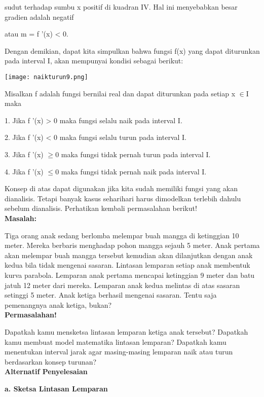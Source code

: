\documentclass[11pt,fleqn]{book} %
\begin{document}
sudut terhadap sumbu x positif di kuadran IV. Hal ini menyebabkan besar gradien adalah negatif 

atau m = f '(x) < 0.

Dengan demikian, dapat kita simpulkan bahwa fungsi f(x) yang dapat diturunkan pada interval I, akan mempunyai kondisi sebagai berikut:

\begin{center}
\texttt{[image: naikturun9.png]}
\end{center}

Misalkan f adalah fungsi bernilai real dan dapat
diturunkan pada setiap x $\in $I maka

1. Jika f '(x) > 0 maka fungsi selalu naik pada interval I.

2. Jika f '(x) < 0 maka fungsi selalu turun pada interval I.

3. Jika f '(x) $\geqslant $0 maka fungsi tidak pernah turun pada interval I.

4. Jika f '(x) $\leqslant $0 maka fungsi tidak pernah naik pada interval I.

Konsep di atas dapat digunakan jika kita sudah memiliki fungsi yang akan dianalisis. Tetapi banyak kasus seharihari harus dimodelkan terlebih dahulu sebelum dianalisis. Perhatikan kembali permasalahan berikut!\\

\textbf{Masalah:}

Tiga orang anak sedang berlomba melempar buah mangga di ketinggian 10 meter. Mereka berbaris menghadap pohon mangga sejauh 5 meter. Anak pertama akan melempar buah mangga tersebut kemudian akan dilanjutkan dengan anak kedua bila tidak mengenai sasaran. Lintasan lemparan setiap anak membentuk kurva parabola. Lemparan anak pertama mencapai ketinggian 9 meter dan batu jatuh 12 meter dari mereka. Lemparan anak kedua melintas di atas sasaran setinggi 5 meter. Anak ketiga berhasil mengenai sasaran. Tentu saja pemenangnya anak ketiga, bukan?
\\

\textbf{Permasalahan!}

Dapatkah kamu mensketsa lintasan lemparan ketiga anak tersebut? Dapatkah kamu membuat model matematika lintasan lemparan? Dapatkah kamu menentukan interval jarak agar masing-masing lemparan naik atau turun berdasarkan konsep turunan?\\


\textbf{Alternatif Penyelesaian}

\textbf{a. Sketsa Lintasan Lemparan}
\end{document}
